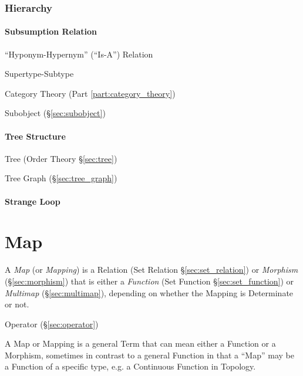 \subsubsection{Hierarchy}\label{sec:hierarchy}

\paragraph{Subsumption Relation}\label{sec:subsumption_relation}\hfill

``Hyponym-Hypernym'' (``Is-A'') Relation


Supertype-Subtype

Category Theory (Part \ref{part:category_theory})

Subobject (\S\ref{sec:subobject})



\paragraph{Tree Structure}\label{sec:tree_structure}\hfill

Tree (Order Theory \S\ref{sec:tree})

Tree Graph (\S\ref{sec:tree_graph})



\paragraph{Strange Loop}\label{sec:strange_loop}\hfill



\section{Map}\label{sec:map}

A \emph{Map} (or \emph{Mapping}) is a Relation (Set Relation
\S\ref{sec:set_relation}) or \emph{Morphism} (\S\ref{sec:morphism})
that is either a \emph{Function} (Set Function
\S\ref{sec:set_function}) or \emph{Multimap} (\S\ref{sec:multimap}),
depending on whether the Mapping is Determinate or not.

Operator (\S\ref{sec:operator})

A Map or Mapping is a general Term that can mean either a Function or
a Morphism, sometimes in contrast to a general Function in that a
``Map'' may be a Function of a specific type, e.g. a Continuous
Function in Topology.

